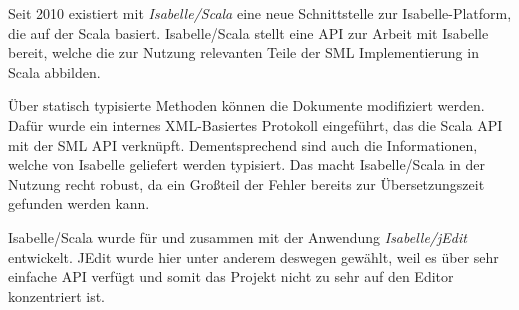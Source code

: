 Seit 2010 existiert mit \textit{Isabelle/Scala} eine neue Schnittstelle zur Isabelle-Platform, die
auf der Scala basiert. Isabelle/Scala stellt eine API zur Arbeit mit Isabelle bereit, welche die zur
Nutzung relevanten Teile der SML Implementierung in Scala abbilden. \cite{iscala}

Über statisch typisierte Methoden können die Dokumente modifiziert werden. Dafür wurde ein internes
XML-Basiertes Protokoll eingeführt, das die Scala API mit der SML API verknüpft.
Dementsprechend sind auch die Informationen, welche von Isabelle geliefert werden typisiert. Das
macht Isabelle/Scala in der Nutzung recht robust, da ein Großteil der Fehler bereits zur
Übersetzungszeit gefunden werden kann.

Isabelle/Scala wurde für und zusammen mit der Anwendung \textit{Isabelle/jEdit} entwickelt. JEdit
wurde hier unter anderem deswegen gewählt, weil es über sehr einfache API verfügt und somit das
Projekt nicht zu sehr auf den Editor konzentriert ist.

